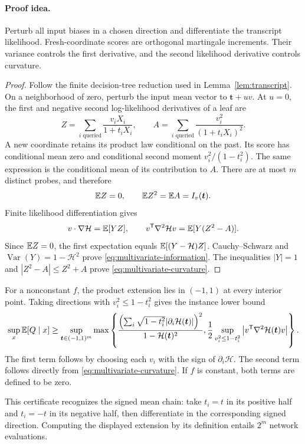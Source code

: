 \paragraph{Proof idea.}
Perturb all input biases in a chosen direction and differentiate
the transcript likelihood. Fresh-coordinate scores are orthogonal martingale
increments. Their variance controls the first derivative, and the second
likelihood derivative controls curvature.

\begin{proof}
Follow the finite decision-tree reduction used in
Lemma~\ref{lem:transcript}.  On a neighborhood of zero, perturb the
input mean vector to \(\boldsymbol t+uv\).  At \(u=0\), the
first and negative second log-likelihood derivatives of a leaf are
\[
 Z=\sum_{i\text{ queried}}\frac{v_iX_i}{1+t_iX_i},
 \qquad
 A=\sum_{i\text{ queried}}\frac{v_i^2}{(1+t_iX_i)^2}.
\]
A new coordinate retains its product law conditional on the past.
Its score has conditional mean zero and conditional second moment
\(v_i^2/(1-t_i^2)\).  The same expression is the conditional
mean of its contribution to \(A\).  There are at most \(m\)
distinct probes, and therefore
\[
 \mathbb E Z=0,\qquad \mathbb E Z^2=\mathbb E A=I_v(\boldsymbol t).
\]
Finite likelihood differentiation gives
\[
 v\cdot\nabla\mathcal H=\mathbb E[YZ],\qquad
 v^{\mathsf T}\nabla^2\mathcal H v=\mathbb E[Y(Z^2-A)].
\]
Since \(\mathbb E Z=0\), the first expectation equals
\(\mathbb E[(Y-\mathcal H)Z]\).  Cauchy--Schwarz and
\(\operatorname{Var}(Y)=1-\mathcal H^2\) prove
\eqref{eq:multivariate-information}.  The inequalities
\(|Y|=1\) and \(|Z^2-A|\le Z^2+A\) prove
\eqref{eq:multivariate-curvature}.
\end{proof}

For a nonconstant \(f\), the product extension lies in \((-1,1)\)
at every interior point.  Taking directions with
\(v_i^2\le1-t_i^2\) gives the instance lower bound
\begin{equation}\label{eq:instance-certificate}
 \sup_x\mathbb E[Q\mid x]\ge
 \sup_{\boldsymbol t\in(-1,1)^m}
 \max\left\{
 \frac{\left(\sum_i\sqrt{1-t_i^2}
                  |\partial_i\mathcal H(\boldsymbol t)|\right)^2}
      {1-\mathcal H(\boldsymbol t)^2},
 \frac12\sup_{v_i^2\le1-t_i^2}
 \left|v^{\mathsf T}\nabla^2\mathcal H(\boldsymbol t)v\right|
 \right\}.
\end{equation}
The first term follows by choosing each \(v_i\) with the sign of
\(\partial_i\mathcal H\).  The second term follows directly
from \eqref{eq:multivariate-curvature}.  If \(f\) is constant,
both terms are defined to be zero.

This certificate recognizes the signed mean chain: take
\(t_i=t\) in its positive half and \(t_i=-t\) in its negative
half, then differentiate in the corresponding signed direction.
Computing the displayed extension by its definition entails
\(2^m\) network evaluations.

